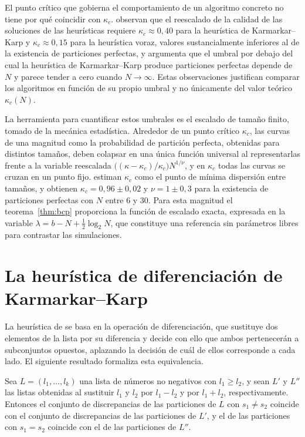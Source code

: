 El punto crítico que gobierna el comportamiento de un algoritmo concreto no tiene por qué coincidir con $\kappa_c$. \textcite{gent1998} observan que el reescalado de la calidad de las soluciones de las heurísticas requiere $\kappa_c \approx 0{,}40$ para la heurística de Karmarkar--Karp y $\kappa_c \approx 0{,}15$ para la heurística voraz, valores sustancialmente inferiores al de la existencia de particiones perfectas, y \textcite{mertens2006} argumenta que el umbral por debajo del cual la heurística de Karmarkar--Karp produce particiones perfectas depende de $N$ y parece tender a cero cuando $N \to \infty$. Estas observaciones justifican comparar los algoritmos en función de su propio umbral y no únicamente del valor teórico $\kappa_c(N)$.

La herramienta para cuantificar estos umbrales es el escalado de tamaño finito, tomado de la mecánica estadística. Alrededor de un punto crítico $\kappa_c$, las curvas de una magnitud como la probabilidad de partición perfecta, obtenidas para distintos tamaños, deben colapsar en una única función universal al representarlas frente a la variable reescalada $\bigl((\kappa - \kappa_c)/\kappa_c\bigr) N^{1/\nu}$, y en $\kappa_c$ todas las curvas se cruzan en un punto fijo. \textcite{gent1996} estiman $\kappa_c$ como el punto de mínima dispersión entre tamaños, y obtienen $\kappa_c = 0{,}96 \pm 0{,}02$ y $\nu = 1 \pm 0{,}3$ para la existencia de particiones perfectas con $N$ entre $6$ y $30$. Para esta magnitud el teorema~\ref{thm:bcp} proporciona la función de escalado exacta, expresada en la variable $\lambda = b - N + \tfrac{1}{2}\log_2 N$, que constituye una referencia sin parámetros libres para contrastar las simulaciones.

\section{La heurística de diferenciación de Karmarkar--Karp}\label{sec:bg-kk}

La heurística de \textcite{karmarkar1982} se basa en la operación de diferenciación, que sustituye dos elementos de la lista por su diferencia y decide con ello que ambos pertenecerán a subconjuntos opuestos, aplazando la decisión de cuál de ellos corresponde a cada lado. El siguiente resultado formaliza esta equivalencia.

\begin{lemma}\label{lem:differencing}
Sea $L = (l_1, \ldots, l_k)$ una lista de números no negativos con $l_1 \geq l_2$, y sean $L'$ y $L''$ las listas obtenidas al sustituir $l_1$ y $l_2$ por $l_1 - l_2$ y por $l_1 + l_2$, respectivamente. Entonces el conjunto de discrepancias de las particiones de $L$ con $s_1 \neq s_2$ coincide con el conjunto de discrepancias de las particiones de $L'$, y el de las particiones con $s_1 = s_2$ coincide con el de las particiones de $L''$.
\end{lemma}

